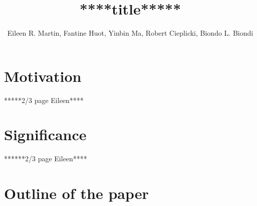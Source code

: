 \documentclass[11pt]{amsart}
\title{****title*****}
\author{Eileen R. Martin, Fantine Huot, Yinbin Ma, Robert Cieplicki, Biondo L. Biondi}
\begin{document}
\maketitle

\section*{Motivation}  *****2/3 page Eileen****

\section*{Significance} ******2/3 page Eileen****

\section*{Outline of the paper}
\end{document}
